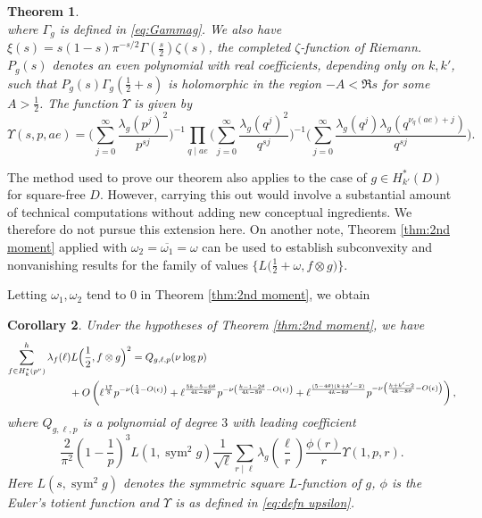 \documentclass[12pt]{amsart}
\theoremstyle{plain}
\newtheorem{thm}{Theorem}[section]
\newtheorem{cor}[thm]{Corollary}
\theoremstyle{definition}
\begin{document}
\begin{thm}
\[    \] 
 where $\Gamma_g$ is defined in \eqref{eq:Gammag}. We also have $\xi(s)=s(1-s)\pi^{-s/2}\Gamma\!\left(\frac{s}{2}\right)\zeta(s)$, the completed $\zeta$-function of Riemann. $P_g(s)$ denotes an even polynomial with real coefficients, depending only on $k,k'$, such that
$P_g(s)\Gamma_g\!\left(\frac12+s\right)$ is holomorphic in the region $-A<\Re s$ for some $A>\frac12$. The function $\Upsilon$ is given by 
 \begin{equation}\label{eq:defn upsilon}
    \Upsilon(s, p, ae)
    =  \Big( \sum_{j=0}^\infty
    \frac{\lambda_g(p^j)^2}{p^{sj}}
    \Big)^{-1}
        \prod_{q\mid ae} 
         \Big( \sum_{j=0}^\infty
    \frac{\lambda_g(q^j)^2}{q^{sj}}
    \Big)^{-1}
     \Big( \sum_{j=0}^\infty
    \frac{\lambda_g(q^j) \lambda_g(q^{\nu_{q}(ae)+j})}{q^{sj}}
    \Big).
  \end{equation}
\end{thm}


The method used to prove our theorem also applies to the case of $g \in H_{k'}^{*}(D)$ for square-free $D.$ However, carrying this out would involve a substantial amount of technical computations without adding new conceptual ingredients. We therefore do not pursue this extension here. On another note, Theorem \ref{thm:2nd moment} applied with $\omega_2 = \overline{\omega_1}=\omega$ can be used to establish subconvexity and nonvanishing results for the family of values $\big\{L\big(\frac12+\omega, f\otimes g \big)\big\}$.

Letting $\omega_1, \omega_2$ tend to $0$ in Theorem \ref{thm:2nd moment}, we obtain 



\begin{cor}\label{cor:thm 2nd moment}
Under the hypotheses of Theorem \ref{thm:2nd moment}, we have
\begin{align*}
\sum_{f\in H_k^\star(p^\nu)}^h
\lambda_f(\ell)
L\Big(\frac12,f\otimes g\Big)^2
&=
Q_{g,\ell,p}(\nu\log p)\\&\hspace{-6em}
+
O\left(\ell^{\frac{17}{8}}p^{-\nu\left(\frac14-O(\epsilon)\right)}
+\ell^{\frac{5k-5-6\theta}{4k-8\theta}}
p^{-\nu\left(\frac{k-1-2\theta}{4k-8\theta}-O(\epsilon)\right)}
+
\ell^{\frac{(5-4\theta)(k+k'-2)}{4k-8\theta}}
p^{-\nu\left(\frac{k+k'-2}{4k-8\theta}-O(\epsilon)\right)}
\right),
\end{align*}
where $Q_{g,\ell,p}$ is a polynomial of degree $3$ with leading coefficient
\[
\frac{2}{\pi^2}
\left(1-\frac1p\right)^3
L(1,\operatorname{sym}^2 g)
\frac1{\sqrt{\ell}}
\sum_{r\mid \ell}
\lambda_g\left(\frac{\ell}{r}\right)
\frac{\phi(r)}{r}
\Upsilon(1,p,r).
\]
Here $L(s,\operatorname{sym}^2 g)$ denotes the symmetric square $L$-function of $g$, $\phi$ is the Euler's totient function and $\Upsilon$ is as defined in \eqref{eq:defn upsilon}.

\end{cor}
\end{document}
